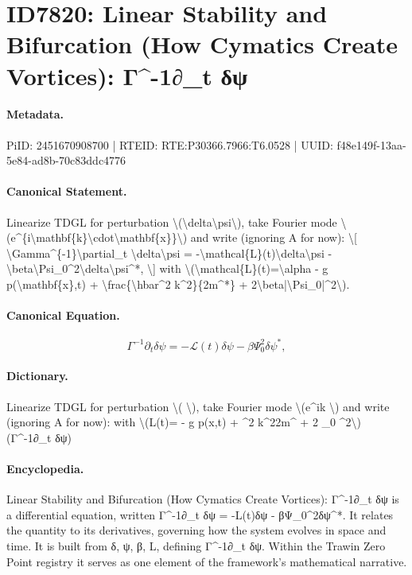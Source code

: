 \section*{ID7820: Linear Stability and Bifurcation (How Cymatics Create Vortices): Γ\textasciicircum{}-1∂\_t δψ}
\paragraph{Metadata.}
PiID: 2451670908700 | RTEID: RTE:P30366.7966:T6.0528 | UUID: f48e149f-13aa-5e84-ad8b-70c83ddc4776

\paragraph{Canonical Statement.}
Linearize TDGL for perturbation \textbackslash{}(\textbackslash{}delta\textbackslash{}psi\textbackslash{}), take Fourier mode \textbackslash{}(e\textasciicircum{}\{i\textbackslash{}mathbf\{k\}\textbackslash{}cdot\textbackslash{}mathbf\{x\}\}\textbackslash{}) and write (ignoring A for now): \textbackslash{}[ \textbackslash{}Gamma\textasciicircum{}\{-1\}\textbackslash{}partial\_t \textbackslash{}delta\textbackslash{}psi = -\textbackslash{}mathcal\{L\}(t)\textbackslash{}delta\textbackslash{}psi - \textbackslash{}beta\textbackslash{}Psi\_0\textasciicircum{}2\textbackslash{}delta\textbackslash{}psi\textasciicircum{}*, \textbackslash{}] with \textbackslash{}(\textbackslash{}mathcal\{L\}(t)=\textbackslash{}alpha - g p(\textbackslash{}mathbf\{x\},t) + \textbackslash{}frac\{\textbackslash{}hbar\textasciicircum{}2 k\textasciicircum{}2\}\{2m\textasciicircum{}*\} + 2\textbackslash{}beta|\textbackslash{}Psi\_0|\textasciicircum{}2\textbackslash{}).

\paragraph{Canonical Equation.}
\[
\Gamma^{-1}\partial_t \delta\psi = -\mathcal{L}(t)\delta\psi - \beta\Psi_0^2\delta\psi^*,
\]

\paragraph{Dictionary.}
Linearize TDGL for perturbation \textbackslash{}( \textbackslash{}), take Fourier mode \textbackslash{}(e\textasciicircum{}ik \textbackslash{}) and write (ignoring A for now): with \textbackslash{}(L(t)= - g p(x,t) + \textasciicircum{}2 k\textasciicircum{}22m\textasciicircum{} + 2 \_0 \textasciicircum{}2\textbackslash{}) (Γ\textasciicircum{}-1∂\_t δψ)

\paragraph{Encyclopedia.}
Linear Stability and Bifurcation (How Cymatics Create Vortices): Γ\textasciicircum{}-1∂\_t δψ is a differential equation, written Γ\textasciicircum{}-1∂\_t δψ = -L(t)δψ - βΨ\_0\textasciicircum{}2δψ\textasciicircum{}*. It relates the quantity to its derivatives, governing how the system evolves in space and time. It is built from δ, ψ, β, L, defining Γ\textasciicircum{}-1∂\_t δψ. Within the Trawin Zero Point registry it serves as one element of the framework's mathematical narrative.

